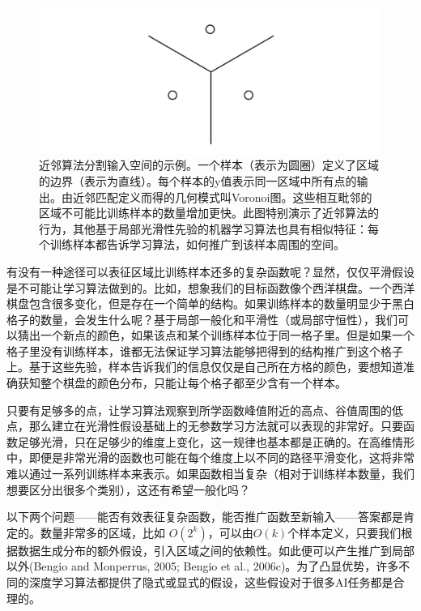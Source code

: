 \begin{figure}[htbp]
   \centering
   \includegraphics[width=6in]{fig/chap5/5_10.png} 
   \caption{近邻算法分割输入空间的示例。一个样本（表示为圆圈）定义了区域的边界（表示为直线）。每个样本的y值表示同一区域中所有点的输出。由近邻匹配定义而得的几何模式叫Voronoi图。这些相互毗邻的区域不可能比训练样本的数量增加更快。此图特别演示了近邻算法的行为，其他基于局部光滑性先验的机器学习算法也具有相似特征：每个训练样本都告诉学习算法，如何推广到该样本周围的空间。}
   \label{fig:5_10}
\end{figure}


有没有一种途径可以表征区域比训练样本还多的复杂函数呢？显然，仅仅平滑假设是不可能让学习算法做到的。比如，想象我们的目标函数像个西洋棋盘。一个西洋棋盘包含很多变化，但是存在一个简单的结构。如果训练样本的数量明显少于黑白格子的数量，会发生什么呢？基于局部一般化和平滑性（或局部守恒性），我们可以猜出一个新点的颜色，如果该点和某个训练样本位于同一格子里。但是如果一个格子里没有训练样本，谁都无法保证学习算法能够把得到的结构推广到这个格子上。基于这些先验，样本告诉我们的信息仅仅是自己所在方格的颜色，要想知道准确获知整个棋盘的颜色分布，只能让每个格子都至少含有一个样本。

只要有足够多的点，让学习算法观察到所学函数峰值附近的高点、谷值周围的低点，那么建立在光滑性假设基础上的无参数学习方法就可以表现的非常好。只要函数足够光滑，只在足够少的维度上变化，这一规律也基本都是正确的。在高维情形中，即便是非常光滑的函数也可能在每个维度上以不同的路径平滑变化，这将非常难以通过一系列训练样本来表示。如果函数相当复杂（相对于训练样本数量，我们想要区分出很多个类别），这还有希望一般化吗？

以下两个问题——能否有效表征复杂函数，能否推广函数至新输入——答案都是肯定的。数量非常多的区域，比如
$O(2^k)$，可以由$O(k)$个样本定义，只要我们根据数据生成分布的额外假设，引入区域之间的依赖性。如此便可以产生推广到局部以外(Bengio and Monperrus, 2005; Bengio et al., 2006c)。为了凸显优势，许多不同的深度学习算法都提供了隐式或显式的假设，这些假设对于很多AI任务都是合理的。


